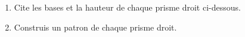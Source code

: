 
\begin{enumerate}
  \item Cite les bases et la hauteur de chaque prisme droit ci-dessous.
  \item Construis un patron de chaque prisme droit.
\end{enumerate}
